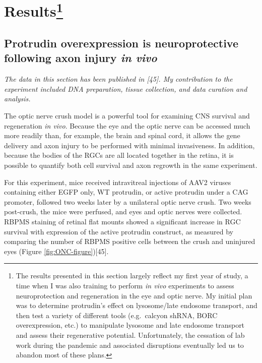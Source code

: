 \documentclass[
  12pt,
  a4paper,
]{book}
\begin{document}
\hypertarget{results}{%
\section[Results]{\texorpdfstring{Results\footnote{The results presented in this section largely reflect my first year of study, a time when I was also training to perform \emph{in vivo} experiments to assess neuroprotection and regeneration in the eye and optic nerve. My initial plan was to determine protrudin's effect on lysosome/late endosome transport, and then test a variety of different tools (e.g.~calcyon shRNA, BORC overexpression, etc.) to manipulate lysosome and late endosome transport and assess their regenerative potential. Unfortunately, the cessation of lab work during the pandemic and associated disruptions eventually led us to abandon most of these plans.}}{Results}}\label{results}}

\hypertarget{protrudin-ONC}{%
\subsection{\texorpdfstring{Protrudin overexpression is neuroprotective following axon injury \emph{in vivo}}{Protrudin overexpression is neuroprotective following axon injury in vivo}}\label{protrudin-ONC}}

\emph{The data in this section has been published in {[}45{]}. My contribution to the experiment included DNA preparation, tissue collection, and data curation and analysis.}

The optic nerve crush model is a powerful tool for examining CNS survival and regeneration \emph{in vivo}. Because the eye and the optic nerve can be accessed much more readily than, for example, the brain and spinal cord, it allows the gene delivery and axon injury to be performed with minimal invasiveness. In addition, because the bodies of the RGCs are all located together in the retina, it is possible to quantify both cell survival and axon regrowth in the same experiment.

For this experiment, mice received intravitreal injections of AAV2 viruses containing either EGFP only, WT protrudin, or active protrudin under a CAG promoter, followed two weeks later by a unilateral optic nerve crush. Two weeks post-crush, the mice were perfused, and eyes and optic nerves were collected. RBPMS staining of retinal flat mounts showed a significant increase in RGC survival with expression of the active protrudin construct, as measured by comparing the number of RBPMS positive cells between the crush and uninjured eyes (Figure \ref{fig:ONC-figure}){[}45{]}.
\end{document}
